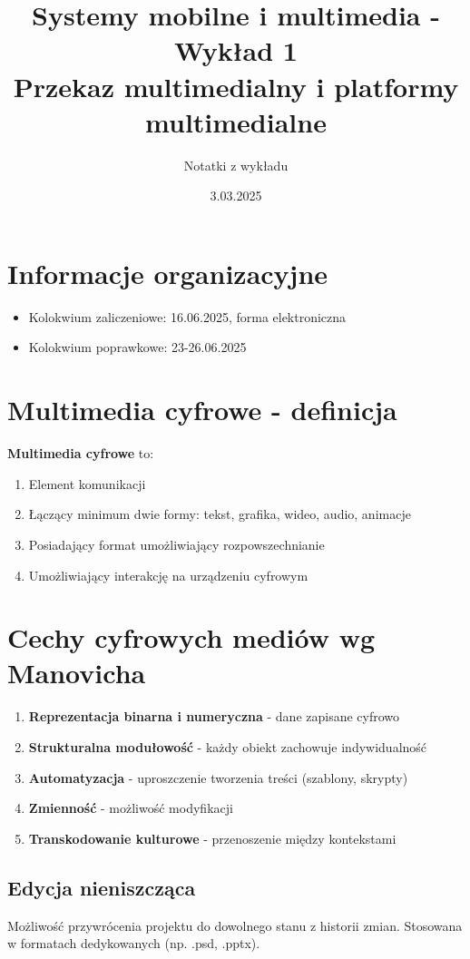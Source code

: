 \documentclass[11pt,a4paper]{article}
\title{\textbf{Systemy mobilne i multimedia - Wykład 1}\\
\large Przekaz multimedialny i platformy multimedialne}
\author{Notatki z wykładu}
\date{3.03.2025}
\begin{document}
\maketitle

\section{Informacje organizacyjne}
\begin{itemize}[noitemsep]
    \item Kolokwium zaliczeniowe: 16.06.2025, forma elektroniczna
    \item Kolokwium poprawkowe: 23-26.06.2025
\end{itemize}

\section{Multimedia cyfrowe - definicja}
\textbf{Multimedia cyfrowe} to:
\begin{enumerate}[noitemsep]
    \item Element komunikacji
    \item Łączący minimum dwie formy: tekst, grafika, wideo, audio, animacje
    \item Posiadający format umożliwiający rozpowszechnianie
    \item Umożliwiający interakcję na urządzeniu cyfrowym
\end{enumerate}

\section{Cechy cyfrowych mediów wg Manovicha}
\begin{enumerate}[noitemsep]
    \item \textbf{Reprezentacja binarna i numeryczna} - dane zapisane cyfrowo
    \item \textbf{Strukturalna modułowość} - każdy obiekt zachowuje indywidualność
    \item \textbf{Automatyzacja} - uproszczenie tworzenia treści (szablony, skrypty)
    \item \textbf{Zmienność} - możliwość modyfikacji
    \item \textbf{Transkodowanie kulturowe} - przenoszenie między kontekstami
\end{enumerate}

\subsection{Edycja nieniszcząca}
Możliwość przywrócenia projektu do dowolnego stanu z historii zmian. Stosowana w formatach dedykowanych (np. .psd, .pptx).
\end{document}
